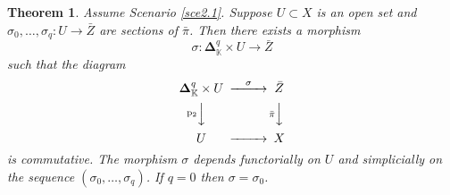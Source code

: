 \documentclass[10pt]{amsart}
\newtheorem{thm}[equation]{Theorem}
\theoremstyle{definition}
\numberwithin{equation}{section}
\newcommand{\mrm}[1]{\mathrm{#1}}
\newcommand{\mbb}[1]{\mathbb{#1}}
\newcommand{\tup}[1]{\textup{#1}}
\newcommand{\bsym}[1]{\boldsymbol{#1}}
\newcommand{\K}{\mbb{K}}
\begin{document}
\begin{thm} \label{thm5.2}
Assume Scenario \tup{\ref{sce2.1}}.
Suppose $U \subset X$ is an open set 
and \linebreak
$\sigma_0, \ldots, \sigma_q : U \to \bar{Z}$ are sections of 
$\bar{\pi}$. Then there exists a morphism 
\[ \sigma : \bsym{\Delta}^q_{\K} \times U \to \bar{Z} \]
such that the diagram
\[ \begin{CD}
\bsym{\Delta}^q_{\K} \times U @>{\sigma}>>
\bar{Z} \\
@V{\mrm{p}_2}VV @V{\bar{\pi}}VV \\
U @>{}>> X 
\end{CD} \]
is commutative. The morphism $\sigma$ depends functorially 
on $U$ and simplicially on the sequence 
$(\sigma_0, \ldots, \sigma_q)$.
If $q = 0$ then $\sigma = \sigma_0$.
\end{thm}
\end{document}
